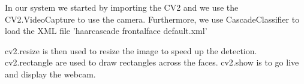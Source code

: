 In our system we started by importing the CV2 and we use the CV2.VideoCapture to use the camera. Furthermore, we use CascadeClassifier to load the XML file 'haarcascade frontalface default.xml'

cv2.resize is then used to resize the image to speed up the detection. cv2.rectangle are used to draw rectangles across the faces. cv2.show is to go live and display the webcam.





